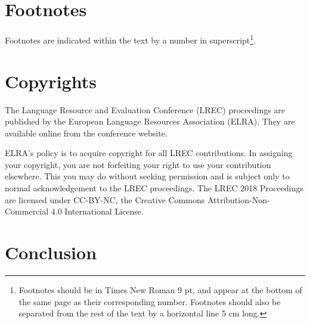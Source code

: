 \documentclass[10pt, a4paper]{article}
\begin{document}
%
%
%
%
%

\section{Footnotes}

Footnotes are indicated within the text by a number in
superscript\footnote{Footnotes should be in Times New Roman 9 pt, and appear at
the bottom of the same page as their corresponding number. Footnotes should also
be separated from the rest of the text by a horizontal line 5 cm long.}.

\section{Copyrights}

The Lan\-gua\-ge Re\-sour\-ce and Evalua\-tion Con\-fe\-rence (LREC)
proceedings are published by the European Language Resources Association (ELRA).
They are available online from the conference website.


ELRA's policy is to acquire copyright for all LREC contributions. In assigning
your copyright, you are not forfeiting your right to use your contribution
elsewhere. This you may do without seeking permission and is subject only to
normal acknowledgement to the LREC proceedings. The LREC 2018 Proceedings are
licensed under CC-BY-NC, the Creative Commons Attribution-Non-Commercial 4.0
International License.

\section{Conclusion}
\end{document}
